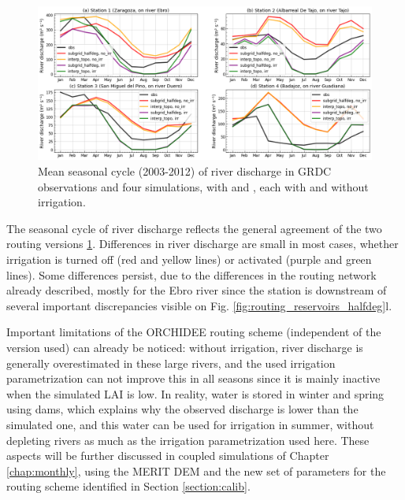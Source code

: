 \begin{figure}[htbp]
    \centering
    \includegraphics[width=\textwidth]{images/chap3/river_discharge/halfdeg_4stations_SC.png}
    \caption{Mean seasonal cycle (2003-2012) of river discharge in GRDC observations and four simulations, with \native and \std, each with and without irrigation.}
    \label{fig:halfdeg_stations_SC}
\end{figure}

The seasonal cycle of river discharge reflects the general agreement of the two routing versions \ref{fig:halfdeg_stations_SC}. Differences in river discharge are small in most cases, whether irrigation is turned off (red and yellow lines) or activated (purple and green lines). Some differences persist, due to the differences in the routing network already described, mostly for the Ebro river since the station is downstream of several important discrepancies visible on Fig. \ref{fig:routing_reservoirs_halfdeg}l. 

Important limitations of the ORCHIDEE routing scheme (independent of the version used) can already be noticed: without irrigation, river discharge is generally overestimated in these large rivers, and the used irrigation parametrization can not improve this in all seasons since it is mainly inactive when the simulated LAI is low. In reality, water is stored in winter and spring using dams, which explains why the observed discharge is lower than the simulated one, and this water can be used for irrigation in summer, without depleting rivers as much as the irrigation parametrization used here. These aspects will be further discussed in coupled simulations of Chapter \ref{chap:monthly}, using the MERIT DEM and the new set of parameters for the \native routing scheme identified in Section \ref{section:calib}.

